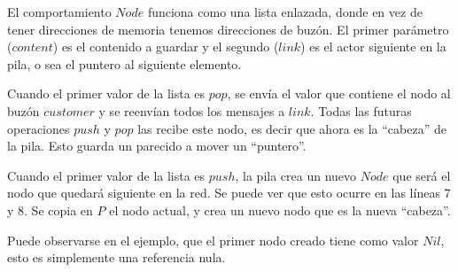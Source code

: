 El comportamiento $Node$ funciona como una lista enlazada, donde en vez de tener direcciones de memoria tenemos direcciones de buzón. El primer parámetro ($content$) es el contenido a guardar y el segundo ($link$) es el actor siguiente en la pila, o sea el puntero al siguiente elemento.

Cuando el primer valor de la lista es $pop$, se envía el valor que contiene el nodo al buzón $customer$ y se reenvían todos los mensajes a $link$. Todas las futuras operaciones $push$ y $pop$ las recibe este nodo, es decir que ahora es la ``cabeza'' de la pila. Esto guarda un parecido a mover un ``puntero''.

Cuando el primer valor de la lista es $push$, la pila crea un nuevo $Node$ que será el nodo que quedará siguiente en la red. Se puede ver que esto ocurre en las líneas 7 y 8. Se copia en $P$ el nodo actual, y crea un nuevo nodo que es la nueva ``cabeza''.

Puede observarse en el ejemplo, que el primer nodo creado tiene como valor $Nil$, esto es simplemente una referencia nula. 

